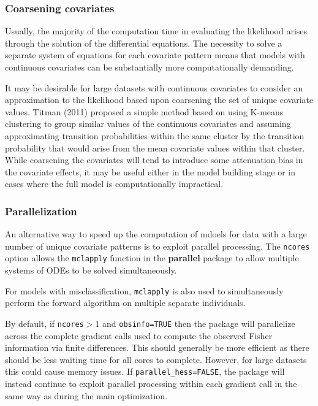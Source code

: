 \documentclass{article}
\numberwithin{equation}{section}
\begin{document}
\subsubsection{Coarsening covariates}

Usually, the majority of the computation time in evaluating the likelihood arises through the solution of the differential equations. The necessity to solve a separate system of equations for each covariate pattern means that models with continuous covariates can be substantially more computationally demanding.

It may be desirable for large datasets with continuous covariates to consider an approximation to the likelihood based upon coarsening the set of unique covariate values. Titman (2011) \cite{titman} proposed a simple method based on using K-means clustering to group similar values of the continuous covariates and assuming approximating transition probabilities within the same cluster by the transition probability that would arise from the mean covariate values within that cluster. While coarsening the covariates will tend to introduce some attenuation bias in the covariate effects, it may be useful either in the model building stage or in cases where the full model is computationally impractical.

\subsubsection{Parallelization}

An alternative way to speed up the computation of mdoels for data with a large number of unique covariate patterns is to exploit parallel processing. The \verb!ncores! option allows the \verb!mclapply! function in the {\bf parallel} package to allow multiple systems of ODEs to be solved simultaneously.

For models with misclassification, \verb!mclapply! is also used to simultaneously perform the forward algorithm on multiple separate individuals.

By default, if \verb!ncores!$>1$ and \verb!obsinfo=TRUE! then the package will parallelize across the complete gradient calls used to compute the observed Fisher information via finite differences. This should generally be more efficient as there should be less waiting time for all cores to complete. However, for large datasets this could cause memory issues. If \verb!parallel_hess=FALSE!, the package will instead continue to exploit parallel processing within each gradient call in the same way as during the main optimization. 
\end{document}

